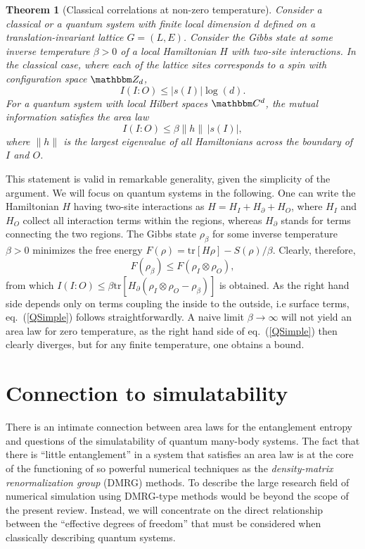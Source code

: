 \documentclass[12pt, rmp,floatfix,epsfig,graphics]{revtex4} %
\newtheorem{theorem}{Theorem}
\begin{document}
\begin{theorem}[Classical correlations
at non-zero temperature]
Consider a classical or a quantum system with 
finite local dimension $d$ defined
on a translation-invariant lattice $G=(L,E)$. Consider the Gibbs
state at some inverse temperature $\beta>0$ of a local Hamiltonian $H$
with two-site interactions. In the classical case, where each of the lattice sites corresponds
to a spin with configuration space $\zz_d$,
\begin{equation}\label{CSimple}
        I(I:O)\leq |s(I)| \log (d).
\end{equation}
For a quantum system with local Hilbert spaces $\cc^d$, the mutual information 
satisfies the area law
\begin{equation}\label{QSimple}
        I(I:O)\leq \beta \|h\|  \, |s(I)|,
\end{equation}
where $\|h\|$ is the largest eigenvalue of all Hamiltonians
across the boundary of $I$ and $O$. 
\end{theorem}

This statement is valid in remarkable generality, 
given the simplicity of the argument. We will focus on 
quantum systems in the following. One can write the 
Hamiltonian $H$ having two-site interactions as
$       H= H_I + H_\partial + H_O$,
where $H_I$ and $H_O$ collect all interaction terms within the 
regions, whereas $H_\partial $ stands for terms 
connecting the two regions. The Gibbs state $\rho_\beta$ for
some inverse temperature $\beta>0$ minimizes the free energy
$F(\rho)= \text{tr}[H\rho] - S(\rho)/\beta$. Clearly, therefore,
\begin{equation*}
        F(\rho_\beta)\leq F(\rho_I\otimes \rho_O),
\end{equation*}
from which $I(I:O) \leq \beta \text{tr}[H_\partial (\rho_I\otimes \rho_O - \rho_\beta)]$
is obtained. As the right hand side depends only on terms
coupling the inside to the outside, i.e surface terms,  
eq.\ (\ref{QSimple}) follows straightforwardly.
A naive limit $\beta\rightarrow\infty$ will not yield an area law for zero temperature,
as the right hand side of eq.\ (\ref{QSimple}) then 
clearly diverges, but for any finite temperature, one obtains a
bound.

\section{Connection to simulatability}\label{Simulate}

There is an intimate connection between area
laws for the entanglement entropy and questions
of the simulatability of quantum many-body systems. 
The fact that there is ``little entanglement'' in a system
that satisfies an area law is at the core of the functioning 
of so powerful numerical techniques as the 
{\it density-matrix renormalization group} (DMRG) methods.
To describe the large research field of numerical 
simulation using DMRG-type methods would be
beyond the scope of the present review. Instead, we will
concentrate on the direct relationship between the 
``effective degrees of freedom'' that must be 
considered when classically describing quantum 
systems.
\end{document}
